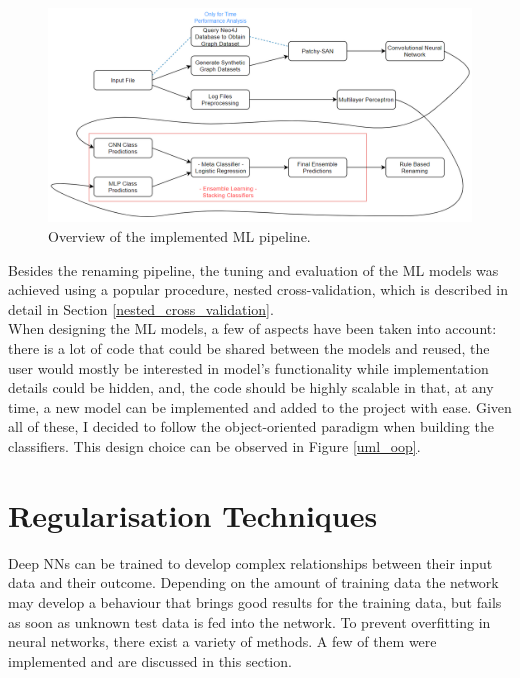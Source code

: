 \begin{figure}[H]
  \centering
  \centerline{\includegraphics[scale = 0.5]{Images/pipeline.png}}
  \caption{Overview of the implemented ML pipeline.}
  \label{pipeline}
\end{figure}

Besides the renaming pipeline, the tuning and evaluation of the ML models was achieved using a popular procedure, nested cross-validation, which is described in detail in Section \ref{nested_cross_validation}. \\

When designing the ML models, a few of aspects have been taken into account: there is a lot of code that could be shared between the models and reused, the user would mostly be interested in model's functionality while implementation details could be hidden, and, the code should be highly scalable in that, at any time, a new model can be implemented and added to the project with ease. Given all of these, I decided to follow the object-oriented paradigm when building the classifiers. This design choice can be observed in Figure \ref{uml_oop}.

\section{Regularisation Techniques}

Deep NNs can be trained to develop complex relationships between their input data and their outcome. Depending on the amount of training data the network may develop a behaviour that brings good results for the training data, but fails as soon as unknown test data is fed into the network. To prevent overfitting in neural networks, there exist a variety of methods. A few of them were implemented and are discussed in this section.

